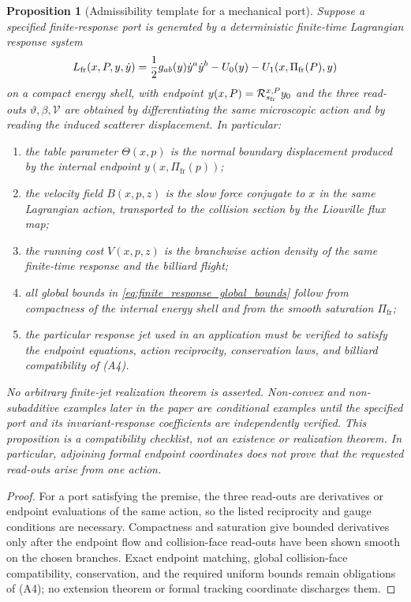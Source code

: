 \documentclass[12pt, letterpaper]{amsart}
\newcommand{\Pifr}{\Pi_{\mathrm{fr}}}
\theoremstyle{plain}
\newtheorem{proposition}[theorem]{Proposition}
\theoremstyle{definition}
\theoremstyle{remark}
\begin{document}
\begin{proposition}[Admissibility template for a mechanical port]
\label{thm:mechanical_port_endogenous}
Suppose a specified finite-response port is generated by a deterministic
finite-time Lagrangian response system
\begin{equation}
\label{eq:internal_lagrangian_port}
    L_{\rm fr}(x,P,y,\dot y)
    =\frac12 g_{ab}(y)\dot y^a\dot y^b-U_0(y)-U_1(x,\Pifr(P),y)
\end{equation}
on a compact energy shell, with endpoint
$y(x,P)=\mathcal R_{s_{\rm fr}}^{x,P}y_0$ and the three read-outs
$\vartheta,\beta,\mathcal V$ are obtained by differentiating the same
microscopic action and by reading the induced scatterer displacement.  In
particular:
\begin{enumerate}[label=\textup{(\alph*)}, wide, labelindent=0pt]
    \item the table parameter $\Theta(x,p)$ is the normal boundary displacement
    produced by the internal endpoint $y(x,\Pifr(p))$;
    \item the velocity field $B(x,p,z)$ is the slow force conjugate to $x$ in the
    same Lagrangian action, transported to the collision section by the
    Liouville flux map;
    \item the running cost $V(x,p,z)$ is the branchwise action density of the
    same finite-time response and the billiard flight;
    \item all global bounds in \eqref{eq:finite_response_global_bounds} follow
    from compactness of the internal energy shell and from the smooth saturation
    $\Pifr$;
    \item the particular response jet used in an application must be verified
    to satisfy the endpoint equations, action reciprocity, conservation laws,
    and billiard compatibility of \textup{(A4)}.
\end{enumerate}
No arbitrary finite-jet realization theorem is asserted.  Non-convex and
non-subadditive examples later in the paper are conditional examples until the
specified port and its invariant-response coefficients are independently
verified.
This proposition is a compatibility checklist, not an existence or realization
theorem.  In particular, adjoining formal endpoint coordinates does not prove
that the requested read-outs arise from one action.
\end{proposition}

\begin{proof}
For a port satisfying the premise, the three read-outs are derivatives or
endpoint evaluations of the same action, so the listed reciprocity and gauge
conditions are necessary.  Compactness and saturation give bounded derivatives
only after the endpoint flow and collision-face read-outs have been shown smooth
on the chosen branches.  Exact endpoint matching, global collision-face
compatibility, conservation, and the required uniform bounds remain obligations
of \textup{(A4)}; no extension theorem or formal tracking coordinate discharges
them.
\end{proof}
\end{document}
